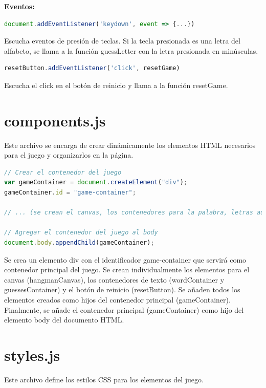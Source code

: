\textbf{Eventos:}

\begin{lstlisting}[language=JavaScript]
document.addEventListener('keydown', event => {...})
\end{lstlisting}

Escucha eventos de presión de teclas. Si la tecla presionada es una letra del alfabeto, se llama a la función guessLetter con la letra presionada en minúsculas.

\begin{lstlisting}[language=JavaScript]
resetButton.addEventListener('click', resetGame)
\end{lstlisting}

Escucha el click en el botón de reinicio y llama a la función resetGame.

\section*{components.js}

Este archivo se encarga de crear dinámicamente los elementos HTML necesarios para el juego y organizarlos en la página.

\begin{lstlisting}[language=JavaScript]
// Crear el contenedor del juego
var gameContainer = document.createElement("div");
gameContainer.id = "game-container";

// ... (se crean el canvas, los contenedores para la palabra, letras adivinadas y botón de reinicio)

// Agregar el contenedor del juego al body
document.body.appendChild(gameContainer);
\end{lstlisting}

Se crea un elemento div con el identificador game-container que servirá como contenedor principal del juego. Se crean individualmente los elementos para el canvas (hangmanCanvas), los contenedores de texto (wordContainer y guessesContainer) y el botón de reinicio (resetButton). Se añaden todos los elementos creados como hijos del contenedor principal (gameContainer). Finalmente, se añade el contenedor principal (gameContainer) como hijo del elemento body del documento HTML.

\section*{styles.js}

Este archivo define los estilos CSS para los elementos del juego.

